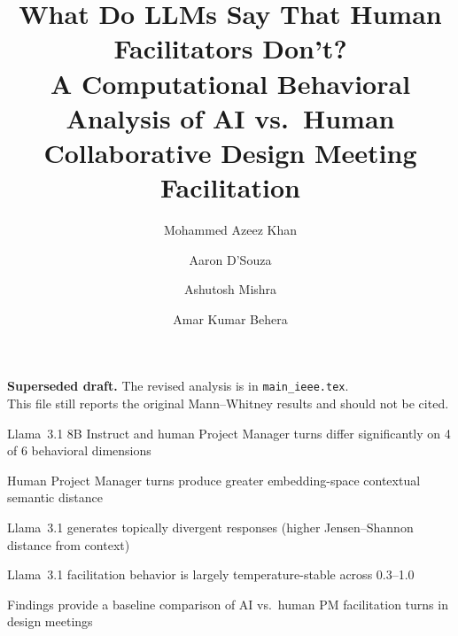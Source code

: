 \documentclass[preprint,12pt,authoryear]{elsarticle}
\begin{document}
\begin{center}
\textbf{Superseded draft.} The revised analysis is in \texttt{main\_ieee.tex}.\\
This file still reports the original Mann--Whitney results and should not be cited.
\end{center}

\begin{frontmatter}

\title{What Do LLMs Say That Human Facilitators Don't? \\
A Computational Behavioral Analysis of AI vs.\ Human Collaborative Design Meeting Facilitation}

\author[inst1]{Mohammed Azeez Khan}

\author[inst2]{Aaron D'Souza}

\author[inst2]{Ashutosh Mishra}

\author[inst3]{Amar Kumar Behera}

\begin{highlights}
\item Llama~3.1 8B Instruct and human Project Manager turns differ significantly on 4 of 6 behavioral dimensions
\item Human Project Manager turns produce greater embedding-space contextual semantic distance
\item Llama~3.1 generates topically divergent responses (higher Jensen--Shannon distance from context)
\item Llama~3.1 facilitation behavior is largely temperature-stable across 0.3--1.0
\item Findings provide a baseline comparison of AI vs.\ human PM facilitation turns in design meetings
\end{highlights}


\end{frontmatter}
\end{document}
